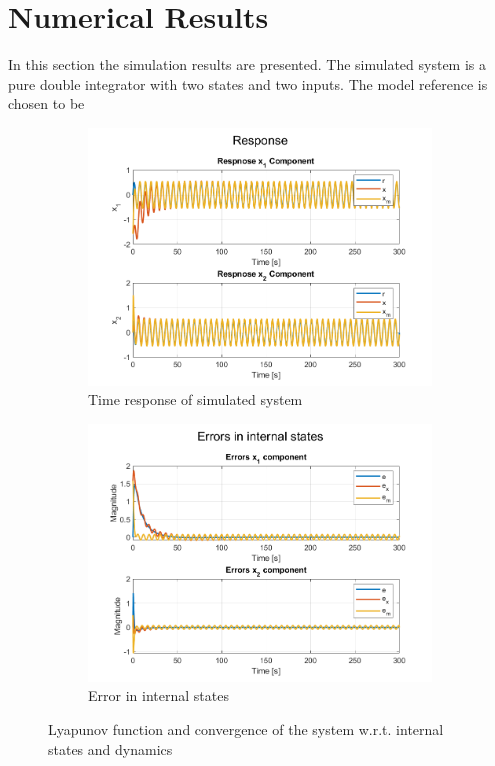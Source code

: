 \section{Numerical Results}
In this section the simulation results are presented. The simulated system is a pure double integrator with two states and two inputs. The model reference is chosen to be 



\begin{figure}[!t]
    \centering
    \begin{subfigure}[b]{0.49\linewidth}
     \centering
     \includegraphics[width=\linewidth]{images/sine/NMRAC_MIMO_Response.png}
     \caption{Time response of simulated system}
     \label{fig:resonse-in-states}
    \end{subfigure}
    \hfill
    \begin{subfigure}[b]{0.49\linewidth}
     \centering
     \includegraphics[width=\linewidth]{images/sine/NMRAC_MIMO_Error.png}
     \caption{Error in internal states}
     \label{fig:error}
    \end{subfigure}
    \caption{Lyapunov function and convergence of the system w.r.t. internal states and dynamics}
    \label{fig:response}
\end{figure}

